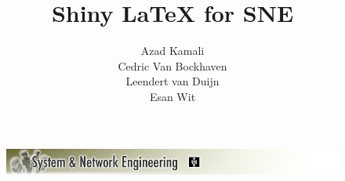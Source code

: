 \documentclass[a4paper,11pt] {article}
\title{Shiny \LaTeX{} for SNE\vspace{10pt}}
\author{
Azad Kamali\\
Cedric Van Bockhaven\\
Leendert van Duijn\\
Esan Wit\\
\vspace{10pt}
}
\begin{document}
\begin{titlepage}
	\enlargethispage{10cm}
	\begin{figure}[h]
	\includegraphics[width=1.0\textwidth]{images/SNELogo.png}
	\end{figure}
	{\let\newpage\relax\maketitle}
\end{titlepage}

\tableofcontents
\newpage






\appendix



\end{document}
